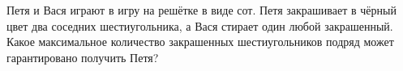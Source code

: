 Петя и Вася играют в игру на решётке в виде сот. Петя закрашивает в чёрный цвет два соседних шестиугольника, а Вася стирает один любой закрашенный. Какое максимальное количество закрашенных шестиугольников подряд может гарантировано получить Петя?
